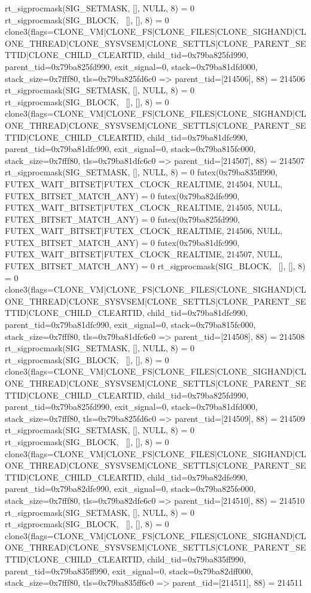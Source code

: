 \begin{breakableverbatim}
rt_sigprocmask(SIG_SETMASK, [], NULL, 8) = 0
rt_sigprocmask(SIG_BLOCK, ~[], [], 8)   = 0
clone3({flags=CLONE_VM|CLONE_FS|CLONE_FILES|CLONE_SIGHAND|CLONE_THREAD|CLONE_SYSVSEM|CLONE_SETTLS|CLONE_PARENT_SETTID|CLONE_CHILD_CLEARTID, child_tid=0x79ba825fd990, parent_tid=0x79ba825fd990, exit_signal=0, stack=0x79ba81dfd000, stack_size=0x7fff80, tls=0x79ba825fd6c0} => {parent_tid=[214506]}, 88) = 214506
rt_sigprocmask(SIG_SETMASK, [], NULL, 8) = 0
rt_sigprocmask(SIG_BLOCK, ~[], [], 8)   = 0
clone3({flags=CLONE_VM|CLONE_FS|CLONE_FILES|CLONE_SIGHAND|CLONE_THREAD|CLONE_SYSVSEM|CLONE_SETTLS|CLONE_PARENT_SETTID|CLONE_CHILD_CLEARTID, child_tid=0x79ba81dfc990, parent_tid=0x79ba81dfc990, exit_signal=0, stack=0x79ba815fc000, stack_size=0x7fff80, tls=0x79ba81dfc6c0} => {parent_tid=[214507]}, 88) = 214507
rt_sigprocmask(SIG_SETMASK, [], NULL, 8) = 0
futex(0x79ba835ff990, FUTEX_WAIT_BITSET|FUTEX_CLOCK_REALTIME, 214504, NULL, FUTEX_BITSET_MATCH_ANY) = 0
futex(0x79ba82dfe990, FUTEX_WAIT_BITSET|FUTEX_CLOCK_REALTIME, 214505, NULL, FUTEX_BITSET_MATCH_ANY) = 0
futex(0x79ba825fd990, FUTEX_WAIT_BITSET|FUTEX_CLOCK_REALTIME, 214506, NULL, FUTEX_BITSET_MATCH_ANY) = 0
futex(0x79ba81dfc990, FUTEX_WAIT_BITSET|FUTEX_CLOCK_REALTIME, 214507, NULL, FUTEX_BITSET_MATCH_ANY) = 0
rt_sigprocmask(SIG_BLOCK, ~[], [], 8)   = 0
clone3({flags=CLONE_VM|CLONE_FS|CLONE_FILES|CLONE_SIGHAND|CLONE_THREAD|CLONE_SYSVSEM|CLONE_SETTLS|CLONE_PARENT_SETTID|CLONE_CHILD_CLEARTID, child_tid=0x79ba81dfc990, parent_tid=0x79ba81dfc990, exit_signal=0, stack=0x79ba815fc000, stack_size=0x7fff80, tls=0x79ba81dfc6c0} => {parent_tid=[214508]}, 88) = 214508
rt_sigprocmask(SIG_SETMASK, [], NULL, 8) = 0
rt_sigprocmask(SIG_BLOCK, ~[], [], 8)   = 0
clone3({flags=CLONE_VM|CLONE_FS|CLONE_FILES|CLONE_SIGHAND|CLONE_THREAD|CLONE_SYSVSEM|CLONE_SETTLS|CLONE_PARENT_SETTID|CLONE_CHILD_CLEARTID, child_tid=0x79ba825fd990, parent_tid=0x79ba825fd990, exit_signal=0, stack=0x79ba81dfd000, stack_size=0x7fff80, tls=0x79ba825fd6c0} => {parent_tid=[214509]}, 88) = 214509
rt_sigprocmask(SIG_SETMASK, [], NULL, 8) = 0
rt_sigprocmask(SIG_BLOCK, ~[], [], 8)   = 0
clone3({flags=CLONE_VM|CLONE_FS|CLONE_FILES|CLONE_SIGHAND|CLONE_THREAD|CLONE_SYSVSEM|CLONE_SETTLS|CLONE_PARENT_SETTID|CLONE_CHILD_CLEARTID, child_tid=0x79ba82dfe990, parent_tid=0x79ba82dfe990, exit_signal=0, stack=0x79ba825fe000, stack_size=0x7fff80, tls=0x79ba82dfe6c0} => {parent_tid=[214510]}, 88) = 214510
rt_sigprocmask(SIG_SETMASK, [], NULL, 8) = 0
rt_sigprocmask(SIG_BLOCK, ~[], [], 8)   = 0
clone3({flags=CLONE_VM|CLONE_FS|CLONE_FILES|CLONE_SIGHAND|CLONE_THREAD|CLONE_SYSVSEM|CLONE_SETTLS|CLONE_PARENT_SETTID|CLONE_CHILD_CLEARTID, child_tid=0x79ba835ff990, parent_tid=0x79ba835ff990, exit_signal=0, stack=0x79ba82dff000, stack_size=0x7fff80, tls=0x79ba835ff6c0} => {parent_tid=[214511]}, 88) = 214511

\end{breakableverbatim}
